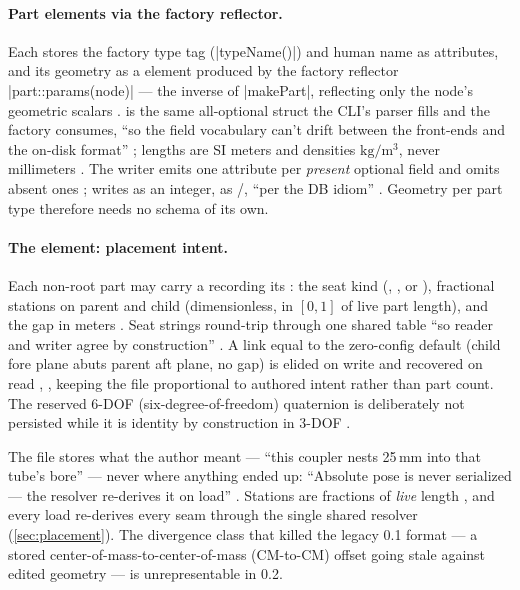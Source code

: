 \paragraph{Part elements via the factory reflector.} Each  stores the
factory type tag (\cppinline|typeName()|) and human name as attributes, and its geometry
as a  element produced by the factory reflector
\cppinline|part::params(node)|  --- the inverse of
\cppinline|makePart|, reflecting only the node's geometric scalars
.  is the same all-optional struct
the CLI's  parser fills and the factory consumes, ``so the field
vocabulary can't drift between the front-ends and the on-disk format''
; lengths are SI meters and densities
$\mathrm{kg/m^3}$, never millimeters . The writer
emits one attribute per \emph{present} optional field and omits absent ones
;  writes as an integer, 
as /, ``per the DB idiom''
. Geometry per part type therefore needs no schema of
its own.

\paragraph{The  element: placement intent.} Each non-root part may carry a
 recording its : the seat kind (,
, or  ), fractional
stations on parent and child (dimensionless, in $[0,1]$ of live part length), and the gap
in meters . Seat strings round-trip through one shared
table ``so reader and writer agree by construction''
. A link equal to the zero-config default (child fore
plane abuts parent aft plane, no gap) is elided on write and recovered on read
, , keeping the
file proportional to authored intent rather than part count. The reserved 6-DOF
(six-degree-of-freedom) quaternion  is deliberately not persisted while it
is identity by construction in 3-DOF .

\begin{designrule}
The file stores what the author meant --- ``this coupler nests 25\,mm into that tube's
bore'' --- never where anything ended up: ``Absolute pose is never serialized --- the
resolver re-derives it on load'' . Stations are
fractions of \emph{live} length , and every load
re-derives every seam through the single shared resolver (\cref{sec:placement}). The
divergence class that killed the legacy 0.1 format --- a stored center-of-mass-to-center-of-mass
(CM-to-CM) offset going stale against edited geometry --- is unrepresentable in 0.2.
\end{designrule}

